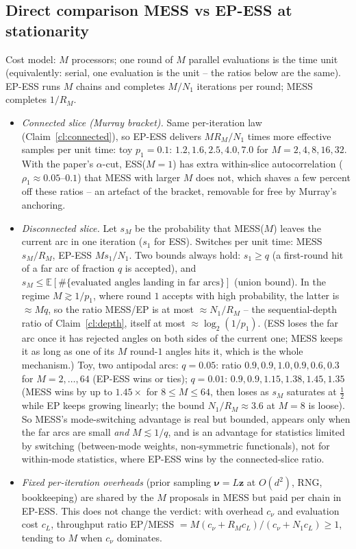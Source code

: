 \documentclass[11pt,a4paper]{article}
\theoremstyle{remark}
\newcommand{\bnu}{\bm{\nu}}
\begin{document}
\subsection{Direct comparison MESS vs EP-ESS at stationarity}\label{sec:direct}
Cost model: $M$ processors; one round of $M$ parallel evaluations is the time unit (equivalently: serial, one evaluation is the unit -- the ratios below are the same). EP-ESS runs $M$ chains and completes $M/N_1$ iterations per round; MESS completes $1/R_M$.
\begin{itemize}[leftmargin=*]
\item \emph{Connected slice (Murray bracket).} Same per-iteration law (Claim~\ref{cl:connected}), so EP-ESS delivers $MR_M/N_1$ times more effective samples per unit time: toy $p_1=0.1$: $1.2,1.6,2.5,4.0,7.0$ for $M=2,4,8,16,32$. With the paper's $\alpha$-cut, ESS($M=1$) has extra within-slice autocorrelation ($\rho_1\approx0.05$--$0.1$) that MESS with larger $M$ does not, which shaves a few percent off these ratios -- an artefact of the bracket, removable for free by Murray's anchoring.
\item \emph{Disconnected slice.} Let $s_M$ be the probability that MESS($M$) leaves the current arc in one iteration ($s_1$ for ESS). Switches per unit time: MESS $s_M/R_M$, EP-ESS $Ms_1/N_1$. Two bounds always hold: $s_1\ge q$ (a first-round hit of a far arc of fraction $q$ is accepted), and $s_M\le\mathbb E[\#\{\text{evaluated angles landing in far arcs}\}]$ (union bound). In the regime $M\gtrsim1/p_1$, where round $1$ accepts with high probability, the latter is $\approx Mq$, so the ratio MESS/EP is at most $\approx N_1/R_M$ -- the sequential-depth ratio of Claim~\ref{cl:depth}, itself at most $\approx\log_2(1/p_1)$. (ESS loses the far arc once it has rejected angles on both sides of the current one; MESS keeps it as long as one of its $M$ round-$1$ angles hits it, which is the whole mechanism.) Toy, two antipodal arcs: $q=0.05$: ratio $0.9,0.9,1.0,0.9,0.6,0.3$ for $M=2,\dots,64$ (EP-ESS wins or ties); $q=0.01$: $0.9,0.9,1.15,1.38,1.45,1.35$ (MESS wins by up to $1.45\times$ for $8\le M\le64$, then loses as $s_M$ saturates at $\tfrac12$ while EP keeps growing linearly; the bound $N_1/R_M\approx3.6$ at $M=8$ is loose). So MESS's mode-switching advantage is real but bounded, appears only when the far arcs are small \emph{and} $M\lesssim1/q$, and is an advantage for statistics limited by switching (between-mode weights, non-symmetric functionals), not for within-mode statistics, where EP-ESS wins by the connected-slice ratio.
\item \emph{Fixed per-iteration overheads} (prior sampling $\bnu=L\bm z$ at $O(d^2)$, RNG, bookkeeping) are shared by the $M$ proposals in MESS but paid per chain in EP-ESS. This does not change the verdict: with overhead $c_\nu$ and evaluation cost $c_L$, throughput ratio EP/MESS $=M(c_\nu+R_Mc_L)/(c_\nu+N_1c_L)\ge1$, tending to $M$ when $c_\nu$ dominates.
\end{itemize}
\end{document}
